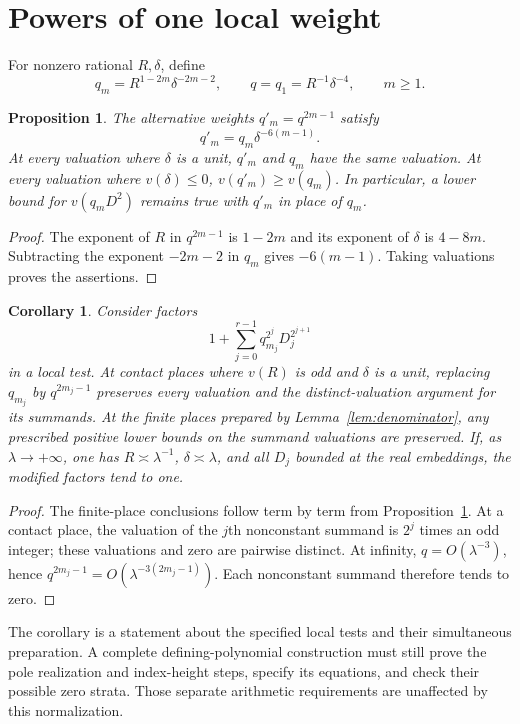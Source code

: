 \documentclass[11pt,a4paper]{article}
\newtheorem{proposition}[theorem]{Proposition}
\newtheorem{corollary}[theorem]{Corollary}
\theoremstyle{remark}\newtheorem{remark}[theorem]{Remark}
\begin{document}
\section{Powers of one local weight}
For nonzero rational $R,\delta$, define
\[
 q_m=R^{1-2m}\delta^{-2m-2},\qquad
 q=q_1=R^{-1}\delta^{-4},\qquad m\ge1.
\]
\begin{proposition}\label{prop:powers}
The alternative weights $q'_m=q^{2m-1}$ satisfy
\[
                 q'_m=q_m\delta^{-6(m-1)}.
\]
At every valuation where $\delta$ is a unit, $q'_m$ and $q_m$ have
the same valuation. At every valuation where $v(\delta)\le0$,
$v(q'_m)\ge v(q_m)$. In particular, a lower bound for
$v(q_mD^2)$ remains true with $q'_m$ in place of $q_m$.
\end{proposition}
\begin{proof}
The exponent of $R$ in $q^{2m-1}$ is $1-2m$ and its exponent of
$\delta$ is $4-8m$. Subtracting the exponent $-2m-2$ in $q_m$
gives $-6(m-1)$. Taking valuations proves the assertions.
\end{proof}

\begin{corollary}\label{cor:preservation}
Consider factors
\[
 1+\sum_{j=0}^{r-1}q_{m_j}^{2^j}D_j^{2^{j+1}}
\]
in a local test. At contact places where $v(R)$ is odd and $\delta$
is a unit, replacing $q_{m_j}$ by $q^{2m_j-1}$ preserves every
valuation and the distinct-valuation argument for its summands.
At the finite places prepared by Lemma~\ref{lem:denominator}, any
prescribed positive lower bounds on the summand valuations are
preserved. If, as $\lambda\to+\infty$, one has
$R\asymp\lambda^{-1}$, $\delta\asymp\lambda$, and all $D_j$
bounded at the real embeddings, the modified factors tend to one.
\end{corollary}
\begin{proof}
The finite-place conclusions follow term by term from
Proposition~\ref{prop:powers}. At a contact place, the valuation of
the $j$th nonconstant summand is $2^j$ times an odd integer; these
valuations and zero are pairwise distinct. At infinity,
$q=O(\lambda^{-3})$, hence
$q^{2m_j-1}=O(\lambda^{-3(2m_j-1)})$. Each nonconstant summand
therefore tends to zero.
\end{proof}

The corollary is a statement about the specified local tests and their
simultaneous preparation. A complete defining-polynomial construction
must still prove the pole realization and index-height steps, specify
its equations, and check their possible zero strata. Those separate
arithmetic requirements are unaffected by this normalization.
\end{document}
